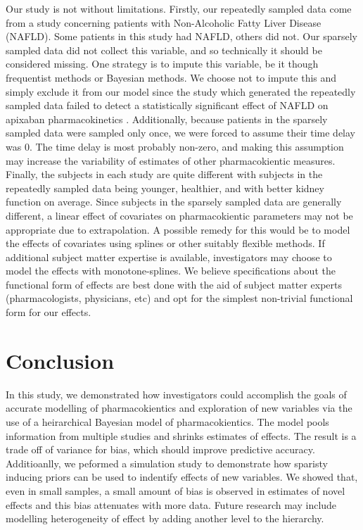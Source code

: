 Our study is not without limitations.  Firstly, our repeatedly sampled data come from a study concerning patients with Non-Alcoholic Fatty Liver Disease (NAFLD).  Some patients in this study had NAFLD, others did not.  Our sparsely sampled data did not collect this variable, and so technically it should be considered missing.  One strategy is to impute this variable, be it though frequentist methods or Bayesian methods.  We choose not to impute this and simply exclude it from our model since the study which generated the repeatedly sampled data failed to detect a statistically significant effect of NAFLD on apixaban pharmacokinetics \cite{tirona2018apixaban}. Additionally, because patients in the sparsely sampled data were sampled only once, we were forced to assume their time delay was 0.  The time delay is most probably non-zero, and making this assumption may increase the variability of estimates of other pharmacokientic measures.  Finally, the subjects in each study are quite different with subjects in the repeatedly sampled data being younger, healthier, and with better kidney function on average. Since subjects in the sparsely sampled data are generally different, a linear effect of covariates on pharmacokientic parameters may not be appropriate due to extrapolation.  A possible remedy for this would be to model the effects of covariates using splines or other suitably flexible methods.  If additional subject matter expertise is available, investigators may choose to model the effects with monotone-splines.  We believe specifications about the functional form of effects are best done with the aid of subject matter experts (pharmacologists, physicians, etc) and opt for the simplest non-trivial functional form for our effects.

\section{Conclusion}


In this study, we demonstrated how investigators could accomplish the goals of accurate modelling of pharmacokientics and exploration of new variables via the use of a heirarchical Bayesian model of pharmacokientics. The model pools information from multiple studies and shrinks estimates of effects.  The result is a trade off of variance for bias, which should improve predictive accuracy.  Additioanlly, we peformed a simulation study to demonstrate how sparisty inducing priors can be used to indentify effects of new variables.  We showed that, even in small samples, a small amount of bias is observed in estimates of novel effects and this bias attenuates with more data. Future research may include modelling heterogeneity of effect by adding another level to the hierarchy.